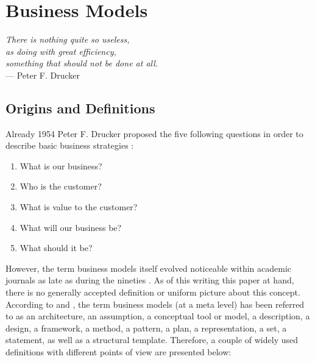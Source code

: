 
\section{Business Models}\label{ch:tf:bm}

\begin{flushright}{\slshape    
	There is nothing quite so useless,\\
	as doing with great efficiency, \\
	something that should not be done at all.} \\ \medskip
	--- Peter F. Drucker
\end{flushright}

\subsection{Origins and Definitions}

Already 1954 Peter F. Drucker proposed the five following questions in order to describe basic business strategies \citep[pp. 49-61]{Drucker1954}:

\begin{enumerate}
	\item What is our business?
	\item Who is the customer?
	\item What is value to the customer?
	\item What will our business be?
	\item What should it be?
\end{enumerate}

However, the term business models itself evolved noticeable within academic journals as late as during the nineties . As of this writing this paper at hand, there is no generally accepted definition or uniform picture about this concept. According to \citet[p. 726]{Morris2005} and \citet[p. 1022]{Zott2011}, the term business models (at a meta level) has been referred to as an architecture, an assumption, a conceptual tool or model, a description, a design, a framework, a method, a pattern, a plan, a representation, a set, a statement, as well as a structural template. Therefore, a couple of widely used definitions with different points of view are presented below:
	
